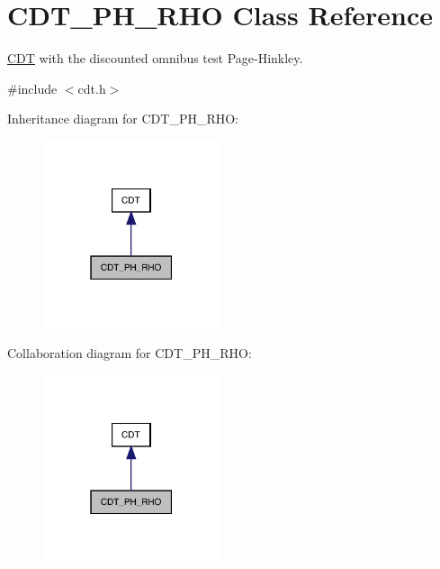 \hypertarget{class_c_d_t___p_h___r_h_o}{}\section{C\+D\+T\+\_\+\+P\+H\+\_\+\+R\+HO Class Reference}
\label{class_c_d_t___p_h___r_h_o}


\mbox{\hyperlink{class_c_d_t}{C\+DT}} with the discounted omnibus test Page-\/\+Hinkley.  




{\ttfamily \#include $<$cdt.\+h$>$}



Inheritance diagram for C\+D\+T\+\_\+\+P\+H\+\_\+\+R\+HO\+:
\nopagebreak
\begin{figure}[H]
\begin{center}
\leavevmode
\includegraphics[width=147pt]{class_c_d_t___p_h___r_h_o__inherit__graph}
\end{center}
\end{figure}


Collaboration diagram for C\+D\+T\+\_\+\+P\+H\+\_\+\+R\+HO\+:
\nopagebreak
\begin{figure}[H]
\begin{center}
\leavevmode
\includegraphics[width=147pt]{class_c_d_t___p_h___r_h_o__coll__graph}
\end{center}
\end{figure}
